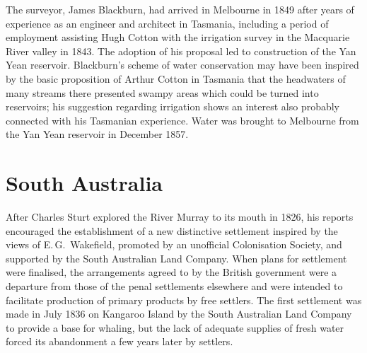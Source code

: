 The surveyor, James Blackburn,  had arrived in
Melbourne in 1849 after years of experience as an engineer and
architect in Tasmania, including a period of employment assisting Hugh
Cotton  with the irrigation survey in the Macquarie
River valley in 1843.  The adoption of his proposal led to
construction of the Yan Yean reservoir.  
Blackburn's scheme of water conservation may have been inspired by the
basic proposition of Arthur Cotton in Tasmania that the headwaters of
many streams there presented swampy areas which could be turned into
reservoirs; his suggestion regarding irrigation shows an interest also
probably connected with his Tasmanian experience.  Water was brought
to Melbourne from the Yan Yean reservoir in December 1857.

\section*{South Australia} 

After Charles Sturt   explored the River Murray
 to its mouth in 1826, his reports encouraged the
establishment of a new distinctive settlement inspired by the views of
E.\,G.~Wakefield,
 promoted by an
unofficial Colonisation Society, and supported by the South Australian
Land Company.  When plans for
settlement were finalised, the arrangements agreed to by the British
government were a departure from those of the penal settlements
elsewhere and were intended to facilitate production of primary
products by free settlers.  The first settlement was made in July 1836
on Kangaroo Island  by the South Australian
Land Company to provide a base for whaling, but the lack of adequate
supplies of fresh water forced its abandonment a few years later by
settlers.


